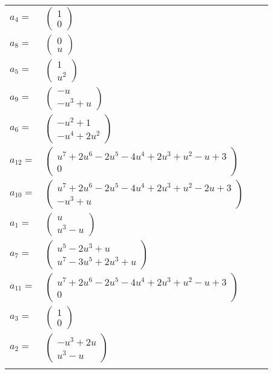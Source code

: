 \documentclass[1p]{elsarticle_modified}
\theoremstyle{definition}
\begin{document}
\begin{tabular}{m{7pt} m{180pt} m{7pt} m{180pt} }
\flushright $a_{4}=$&$\begin{pmatrix}1\\0\end{pmatrix}$ \\
\flushright $a_{8}=$&$\begin{pmatrix}0\\u\end{pmatrix}$ \\
\flushright $a_{5}=$&$\begin{pmatrix}1\\u^2\end{pmatrix}$ \\
\flushright $a_{9}=$&$\begin{pmatrix}- u\\- u^3+u\end{pmatrix}$ \\
\flushright $a_{6}=$&$\begin{pmatrix}- u^2+1\\- u^4+2 u^2\end{pmatrix}$ \\
\flushright $a_{12}=$&$\begin{pmatrix}u^7+2 u^6-2 u^5-4 u^4+2 u^3+u^2- u+3\\0\end{pmatrix}$ \\
\flushright $a_{10}=$&$\begin{pmatrix}u^7+2 u^6-2 u^5-4 u^4+2 u^3+u^2-2 u+3\\- u^3+u\end{pmatrix}$ \\
\flushright $a_{1}=$&$\begin{pmatrix}u\\u^3- u\end{pmatrix}$ \\
\flushright $a_{7}=$&$\begin{pmatrix}u^5-2 u^3+u\\u^7-3 u^5+2 u^3+u\end{pmatrix}$ \\
\flushright $a_{11}=$&$\begin{pmatrix}u^7+2 u^6-2 u^5-4 u^4+2 u^3+u^2- u+3\\0\end{pmatrix}$ \\
\flushright $a_{3}=$&$\begin{pmatrix}1\\0\end{pmatrix}$ \\
\flushright $a_{2}=$&$\begin{pmatrix}- u^3+2 u\\u^3- u\end{pmatrix}$\\&\end{tabular}
\end{document}
